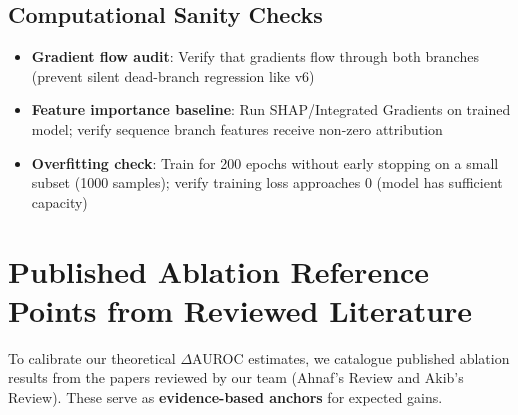 \documentclass[11pt,a4paper]{article}
\begin{document}
\subsection{Computational Sanity Checks}

\begin{itemize}
    \item \textbf{Gradient flow audit}: Verify that gradients flow through both branches (prevent silent dead-branch regression like v6)
    \item \textbf{Feature importance baseline}: Run SHAP/Integrated Gradients on trained model; verify sequence branch features receive non-zero attribution
    \item \textbf{Overfitting check}: Train for 200 epochs without early stopping on a small subset (1000 samples); verify training loss approaches 0 (model has sufficient capacity)
\end{itemize}

\section{Published Ablation Reference Points from Reviewed Literature}
\label{sec:reference_points}

To calibrate our theoretical $\Delta$AUROC estimates, we catalogue published ablation results from the papers reviewed by our team (Ahnaf's Review and Akib's Review). These serve as \textbf{evidence-based anchors} for expected gains.
\end{document}
